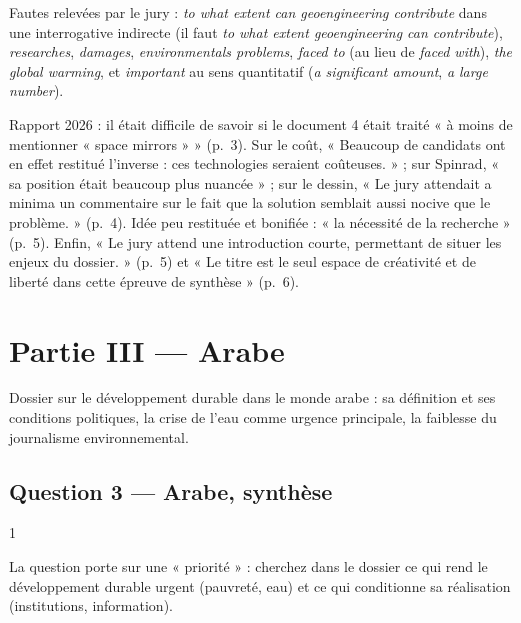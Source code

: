 \documentclass[11pt,a4paper]{article}
\begin{document}
\begin{piege}

Fautes relevées par le jury : \emph{to what extent can geoengineering contribute} dans une interrogative indirecte (il faut \emph{to what extent geoengineering can contribute}), \emph{researches}, \emph{damages}, \emph{environmentals problems}, \emph{faced to} (au lieu de \emph{faced with}), \emph{the global warming}, et \emph{important} au sens quantitatif (\emph{a significant amount}, \emph{a large number}).

\end{piege}

\begin{jury}

Rapport 2026 : il était difficile de savoir si le document 4 était traité « à moins de mentionner « space mirrors » » (p.~3). Sur le coût, « Beaucoup de candidats ont en effet restitué l'inverse : ces technologies seraient coûteuses. » ; sur Spinrad, « sa position était beaucoup plus nuancée » ; sur le dessin, « Le jury attendait a minima un commentaire sur le fait que la solution semblait aussi nocive que le problème. » (p.~4). Idée peu restituée et bonifiée : « la nécessité de la recherche » (p.~5). Enfin, « Le jury attend une introduction courte, permettant de situer les enjeux du dossier. » (p.~5) et « Le titre est le seul espace de créativité et de liberté dans cette épreuve de synthèse » (p.~6).

\end{jury}

\hypertarget{partie-iii-arabe}{%
\section{Partie III --- Arabe}\label{partie-iii-arabe}}

Dossier sur le développement durable dans le monde arabe : sa définition et ses conditions politiques, la crise de l'eau comme urgence principale, la faiblesse du journalisme environnemental.

\hypertarget{question-3-arabe-synthuxe8se}{%
\subsection{Question 3 --- Arabe, synthèse}\label{question-3-arabe-synthuxe8se}}

\begin{indication}{1}

La question porte sur une « priorité » : cherchez dans le dossier ce qui rend le développement durable urgent (pauvreté, eau) et ce qui conditionne sa réalisation (institutions, information).

\end{indication}
\end{document}
